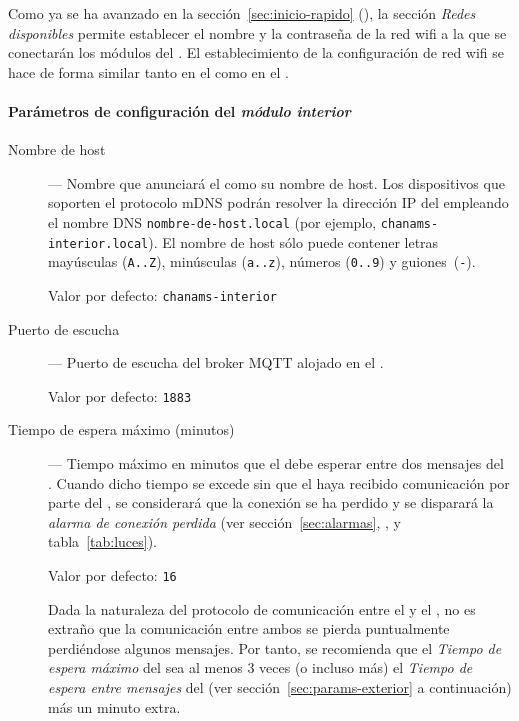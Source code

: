 Como ya se ha avanzado en la sección~\ref{sec:inicio-rapido} (\textit{}), la sección \emph{Redes disponibles} permite establecer el nombre y la contraseña de la red wifi a la que se conectarán los módulos del \CMS. El establecimiento de la configuración de red wifi se hace de forma similar tanto en el \MIE como en el \MEE. 

\paragraph{Parámetros de configuración del \textit{módulo interior}}
\label{sec:params-interior}

\begin{description}

  \item[Nombre de host] --- Nombre que anunciará el \MIE como su nombre de host. Los dispositivos que soporten el protocolo mDNS podrán resolver la dirección IP del \MI empleando el nombre DNS \texttt{nombre-de-host\allowbreak.\allowbreak\-lo\-cal} (por ejemplo, \texttt{chanams-interior.local}). El nombre de host sólo puede contener letras mayúsculas (\texttt{A..Z}), minúsculas (\texttt{a..z}), números (\texttt{0..9}) y \mbox{guiones~(\texttt{-})}.
  
  Valor por defecto: \texttt{chanams-interior}
  
  \item[Puerto de escucha] --- Puerto de escucha del broker MQTT alojado en el \MIE.

  Valor por defecto: \texttt{1883}
  
  \item[Tiempo de espera máximo (minutos)] --- Tiempo máximo en minutos que el \MIE debe esperar entre dos mensajes del \MEE. Cuando dicho tiempo se excede sin que el \MI haya recibido comunicación por parte del \ME, se considerará que la conexión se ha perdido y se disparará la \emph{alarma de conexión perdida} (ver sección~\ref{sec:alarmas}, \textit{}, y tabla~\ref{tab:luces}).
  
  Valor por defecto: \texttt{16}
  
  Dada la naturaleza del protocolo de comunicación entre el \MEE y el \MIE, no es extraño que la comunicación entre ambos se pierda puntualmente perdiéndose algunos mensajes. Por tanto, se recomienda que el \emph{Tiempo de espera máximo} del \MIE sea al menos 3 veces (o incluso más) el \emph{Tiempo de espera entre mensajes} del \MEE (ver sección~\ref{sec:params-exterior} a continuación) más un minuto extra.
  

\end{description}
